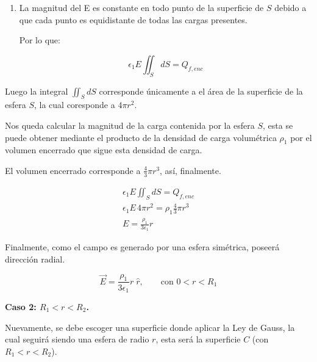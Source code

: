 \documentclass[11pt]{article}
\begin{document}
\begin{solucion}
\begin{enumerate}
              \begin{equation}
                  \epsilon_1\oiint_S EdS = Q_{f, enc}
              \end{equation}

        \item La magnitud del E es constante en todo punto de la superficie de $S$ debido a que cada punto es equidistante de todas las cargas presentes.

              Por lo que:

              \begin{equation}
                  \epsilon_1E \iint_S dS = Q_{f, enc}
              \end{equation}
    \end{enumerate}

    Luego la integral $\iint_S dS$ corresponde únicamente a el área de la superficie de la esfera $S$, la cual coresponde a $4\pi r^2$.

    Nos queda calcular la magnitud de la carga contenida por la esfera $S$, esta se puede obtener mediante el producto de la densidad de carga volumétrica $\rho_1$ por el volumen encerrado que sigue esta densidad de carga.

    El volumen encerrado corresponde a $\frac{4}{3}\pi r^3$, así, finalmente.

    \begin{align}
        \epsilon_1E \iint_S dS = Q_{f, enc}
        \\
        \epsilon_1E\, 4\pi r^2 = \rho_1\frac{4}{3}\pi r^3
        \\
        E = \frac{\rho_1}{3\epsilon_1}r
    \end{align}

    Finalmente, como el campo es generado por una esfera simétrica, poseerá dirección radial.

    \begin{equation}
        \vec{E} = \frac{\rho_1}{3\epsilon_1}r \;\hat{r}, \qquad \text{con } 0<r<R_1
    \end{equation}

    {\bfseries \large Caso 2: $R_1<r<R_2$.}

    Nuevamente, se debe escoger una superficie donde aplicar la Ley de Gauss, la cual seguirá siendo una esfera de radio $r$, esta será la superficie $C$ (con $R_1<r<R_2$).

    \begin{figure}[H]
        \centering
\end{figure}
\end{solucion}
\end{document}

